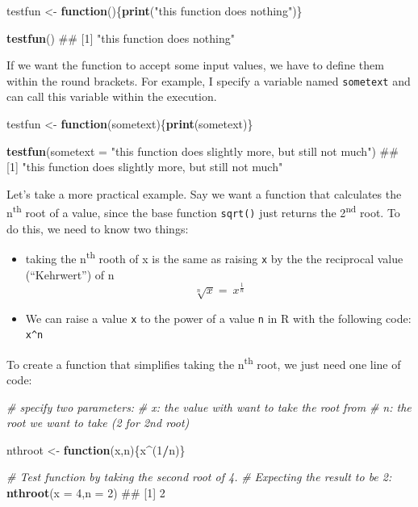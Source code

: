 \documentclass[]{book}
\newenvironment{Shaded}{\begin{snugshade}}{\end{snugshade}}
\newcommand{\KeywordTok}[1]{\textcolor[rgb]{0.13,0.29,0.53}{\textbf{#1}}}
\newcommand{\DataTypeTok}[1]{\textcolor[rgb]{0.13,0.29,0.53}{#1}}
\newcommand{\DecValTok}[1]{\textcolor[rgb]{0.00,0.00,0.81}{#1}}
\newcommand{\StringTok}[1]{\textcolor[rgb]{0.31,0.60,0.02}{#1}}
\newcommand{\CommentTok}[1]{\textcolor[rgb]{0.56,0.35,0.01}{\textit{#1}}}
\newcommand{\ControlFlowTok}[1]{\textcolor[rgb]{0.13,0.29,0.53}{\textbf{#1}}}
\newcommand{\OperatorTok}[1]{\textcolor[rgb]{0.81,0.36,0.00}{\textbf{#1}}}
\newcommand{\NormalTok}[1]{#1}
\providecommand{\tightlist}{%
  \setlength{\itemsep}{0pt}\setlength{\parskip}{0pt}}
\begin{document}
\begin{Shaded}
\begin{Highlighting}[]
\NormalTok{testfun <-}\StringTok{ }\ControlFlowTok{function}\NormalTok{()\{}\KeywordTok{print}\NormalTok{(}\StringTok{"this function does nothing"}\NormalTok{)\}}

\KeywordTok{testfun}\NormalTok{()}
\NormalTok{## [1] "this function does nothing"}
\end{Highlighting}
\end{Shaded}

If we want the function to accept some input values, we have to define
them within the round brackets. For example, I specify a variable named
\texttt{sometext} and can call this variable within the execution.

\begin{Shaded}
\begin{Highlighting}[]
\NormalTok{testfun <-}\StringTok{ }\ControlFlowTok{function}\NormalTok{(sometext)\{}\KeywordTok{print}\NormalTok{(sometext)\}}

\KeywordTok{testfun}\NormalTok{(}\DataTypeTok{sometext =} \StringTok{"this function does slightly more, but still not much"}\NormalTok{)}
\NormalTok{## [1] "this function does slightly more, but still not much"}
\end{Highlighting}
\end{Shaded}

Let's take a more practical example. Say we want a function that
calculates the n\textsuperscript{th} root of a value, since the base
function \texttt{sqrt()} just returns the 2\textsuperscript{nd} root. To
do this, we need to know two things:

\begin{itemize}
\tightlist
\item
  taking the n\textsuperscript{th} rooth of x is the same as raising
  \texttt{x} by the the reciprocal value (``Kehrwert'') of n
  \[\sqrt[n]{x}=\ x^{\frac{1}{n}}\]
\item
  We can raise a value \texttt{x} to the power of a value \texttt{n} in
  R with the following code: \texttt{x\^{}n}
\end{itemize}

To create a function that simplifies taking the n\textsuperscript{th}
root, we just need one line of code:

\begin{Shaded}
\begin{Highlighting}[]
\CommentTok{# specify two parameters:}
\CommentTok{# x: the value  with want to take the root from}
\CommentTok{# n: the root we want to take (2 for 2nd root)}

\NormalTok{nthroot <-}\StringTok{ }\ControlFlowTok{function}\NormalTok{(x,n)\{x}\OperatorTok{^}\NormalTok{(}\DecValTok{1}\OperatorTok{/}\NormalTok{n)\}}

\CommentTok{# Test function by taking the second root of 4. }
\CommentTok{# Expecting the result to be 2:}
\KeywordTok{nthroot}\NormalTok{(}\DataTypeTok{x =} \DecValTok{4}\NormalTok{,}\DataTypeTok{n =} \DecValTok{2}\NormalTok{)}
\NormalTok{## [1] 2}
\end{Highlighting}
\end{Shaded}
\end{document}
